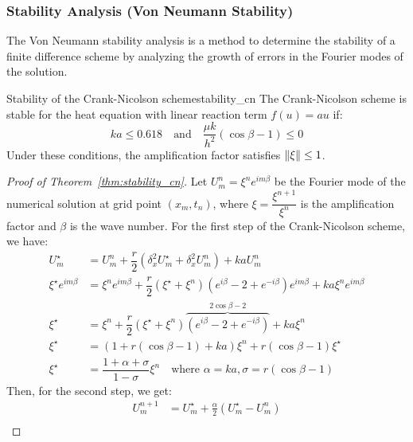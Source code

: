 \subsubsection{Stability Analysis (Von Neumann Stability)}
The Von Neumann stability analysis is a method to determine the stability of a finite difference scheme by analyzing the growth of errors in the Fourier modes of the solution.
\begin{theorem}{Stability of the Crank-Nicolson scheme}{stability_cn}
  The Crank-Nicolson scheme is stable for the heat equation with linear reaction term \(f(u) = au\) if:
  \[
    ka \leq 0.618 \quad \text{and} \quad \frac{\mu k}{h^2}(\cos\beta - 1) \leq 0
  \]
  Under these conditions, the amplification factor satisfies \(\lVert\xi\rVert \leq 1\).
\end{theorem}
\begin{proof}[Proof of Theorem~\ref{thm:stability_cn}]
  Let \(U_m^n = \xi^n e^{i m \beta}\) be the Fourier mode of the numerical solution at grid point \((x_m, t_n)\), where \(\xi=\dfrac{\xi^{n+1}}{\xi^n}\) is the amplification factor and \(\beta\) is the wave number.
  For the first step of the Crank-Nicolson scheme, we have:
  \begin{align*}
    U_m^\star               & = U_m^n + \dfrac{r}{2} (\delta_x^2 U_m^\star + \delta_x^2 U_m^n) + k a U_m^n                                                                     \\
    \xi^\star e^{i m \beta} & = \xi^n e^{i m \beta} + \dfrac{r}{2} \left(\xi^\star + \xi^n\right)\left(e^{i\beta} - 2 + e^{-i\beta}\right)e^{im\beta}+ k a \xi^n e^{i m \beta} \\
    \xi^\star               & = \xi^n + \dfrac{r}{2} \left(\xi^\star + \xi^n \right)\overbrace{\left(e^{i \beta} - 2 + e^{-i \beta}\right)}^{2\cos\beta - 2} + k a \xi^n       \\
    \xi^\star               & = (1 + r(\cos\beta - 1) + ka) \xi^n + r(\cos\beta - 1)\xi^\star                                                                                  \\
    \xi^\star               & = \dfrac{1 + \alpha + \sigma}{1 - \sigma} \xi^n \quad \text{where } \alpha = ka, \sigma = r(\cos\beta - 1)
  \end{align*}
  Then, for the second step, we get:
  \begin{align*}
    U_m^{n+1}               & = U_m^\star + \tfrac{\alpha}{2}(U_m^\star - U_m^n)                                                                      \\

\end{align*}
\end{proof}
